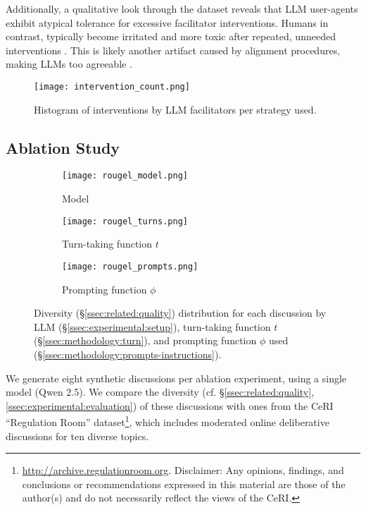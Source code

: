 Additionally, a qualitative look through the dataset reveals that \ac{LLM} user-agents exhibit atypical tolerance for excessive facilitator interventions. Humans in contrast, typically become irritated and more toxic after repeated, unneeded interventions \citep{schaffner_community_guidelines, make_reddit_great, proactive_moderation, cresci_pesonalized_interventions}. This is likely another artifact caused by alignment procedures, making \acp{LLM} too agreeable \citep{park2023game}.

\begin{figure}[t]
	\centering
	\texttt{[image: intervention\_count.png]}
	\caption{Histogram of interventions by \ac{LLM} facilitators per strategy used.}
	\label{fig:intervention_count}
\end{figure}


\subsection{Ablation Study}
\label{ssec:results:ablation}

\begin{figure*}[t]
    \begin{subfigure}{0.32\linewidth}
        \texttt{[image: rougel\_model.png]}
        \caption{Model}
        \label{fig:rougel_model}
    \end{subfigure}%
    \hfill
    \begin{subfigure}{0.32\linewidth}
        \texttt{[image: rougel\_turns.png]}
        \caption{Turn-taking function $t$}
        \label{fig:rougel_turns}
    \end{subfigure}%
    \hfill
    \begin{subfigure}{0.32\linewidth}
        \texttt{[image: rougel\_prompts.png]}
        \caption{Prompting function $\phi$}
        \label{fig:rougel_prompts}
    \end{subfigure}%

    \caption{Diversity (\S\ref{ssec:related:quality}) distribution for each discussion by \ac{LLM} (\S\ref{ssec:experimental:setup}), turn-taking function $t$ (\S\ref{ssec:methodology:turn}), and prompting function $\phi$ used (\S\ref{ssec:methodology:prompts-instructions}).}
    \label{fig:diversity}
\end{figure*}

We generate eight synthetic discussions per ablation experiment, using a single model (Qwen 2.5). We compare the diversity (cf. \S\ref{ssec:related:quality}, \ref{ssec:experimental:evaluation}) of these discussions with ones from the \ac{CeRI} “Regulation Room” dataset\footnote{\url{http://archive.regulationroom.org}. Disclaimer: Any opinions, findings, and conclusions or recommendations expressed in this material are those of the author(s) and do not necessarily reflect the views of the \ac{CeRI}.}, which includes moderated online deliberative discussions for ten diverse topics.


